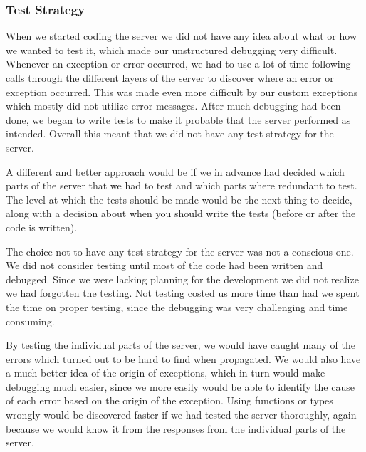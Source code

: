 \subsubsection{Test Strategy}
When we started coding the server we did not have any idea about what or how we wanted to test it, which made our unstructured debugging very difficult.
Whenever an exception or error occurred, we had to use a lot of time following calls through the different layers of the server to discover where an error or exception occurred.
This was made even more difficult by our custom exceptions which mostly did not utilize error messages.
After much debugging had been done, we began to write tests to make it probable that the server performed as intended.
Overall this meant that we did not have any test strategy for the server.

A different and better approach would be if we in advance had decided which parts of the server that we had to test and which parts where redundant to test.
The level at which the tests should be made would be the next thing to decide, along with a decision about when you should write the tests (before or after the code is written).

The choice not to have any test strategy for the server was not a conscious one.
We did not consider testing until most of the code had been written and debugged.
Since we were lacking planning for the development we did not realize we had forgotten the testing.
Not testing costed us more time than had we spent the time on proper testing, since the debugging was very challenging and time consuming.

By testing the individual parts of the server, we would have caught many of the errors which turned out to be hard to find when propagated.
We would also have a much better idea of the origin of exceptions, which in turn would make debugging much easier, since we more easily would be able to identify the cause of each error based on the origin of the exception.
Using functions or types wrongly would be discovered faster if we had tested the server thoroughly, again because we would know it from the responses from the individual parts of the server.